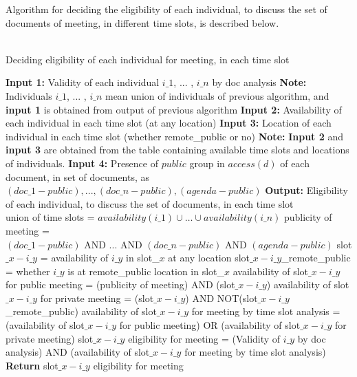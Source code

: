 Algorithm for deciding the eligibility of each individual, to discuss the set of documents of meeting, in different time slots, is described below.\\ \\
\begin{algorithm}[H]
    \caption{Deciding eligibility of each individual for meeting, in each time slot}
    \begin{algorithmic}
        \State \textbf{Input 1:} Validity of each individual \(i\_1\), ... , \(i\_n\) by doc analysis
        \State \textbf{Note:} Individuals \(i\_1\), ... , \(i\_n\) mean union of individuals of previous algorithm, and \textbf{input 1} is obtained from output of previous algorithm
        \State \textbf{Input 2:} Availability of each individual in each time slot (at any location) 
        \State \textbf{Input 3:} Location of each individual in each time slot (whether remote\_public or no)
        \State \textbf{Note:} \textbf{Input 2} and \textbf{input 3} are obtained from the table containing available time slots and locations of individuals.
        \State \textbf{Input 4:} Presence of \(public\) group in \(access(d)\) of each document, in set of documents, as $(doc\_1-public) , ... , (doc\_n-public) , (agenda-public)$
        \State \textbf{Output:} Eligibility of each individual, to discuss the set of documents, in each time slot \\
        \State union of time slots = \(availability(i\_1) \cup \dots \cup availability(i\_n)\)
                \State publicity of meeting = \((doc\_1-public) \text{ AND } ... \text{ AND } (doc\_n-public) \text{ AND } (agenda-public)\)
                \State slot\(\_x-i\_y\) = availability of \(i\_y\) in slot\_\(x\) at any location
                \State slot\(\_x-i\_y\)\_remote\_public = whether \(i\_y\) is at remote\_public location in slot\_\(x\) 
                \State availability of slot\(\_x-i\_y\) for public meeting = (publicity of meeting) AND (slot\(\_x-i\_y\))
                \State availability of slot\(\_x-i\_y\) for private meeting = (slot\(\_x-i\_y\)) AND NOT(slot\(\_x-i\_y\)\_remote\_public)
                \State availability of slot\(\_x-i\_y\) for meeting by time slot analysis = (availability of slot\(\_x-i\_y\) for public meeting) OR (availability of slot\(\_x-i\_y\) for private meeting)
                \State slot\(\_x-i\_y\) eligibility for meeting = (Validity of \(i\_y\) by doc analysis) AND (availability of slot\(\_x-i\_y\) for meeting by time slot analysis)
            \EndFor
            \State \textbf{Return} slot\(\_x-i\_y\) eligibility for meeting
        \EndFor
    \end{algorithmic}
\end{algorithm}
